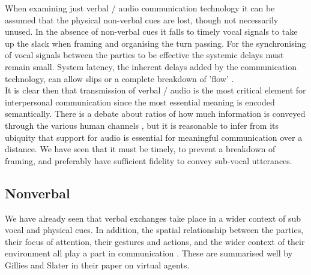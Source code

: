 When examining just verbal / audio communication technology it can be assumed that the physical non-verbal cues are lost, though not necessarily unused. In the absence of non-verbal cues it falls to timely vocal signals to take up the slack when framing and organising the turn passing. For the synchronising of vocal signals between the parties to be effective the systemic delays must remain small. System latency, the inherent delays added by the communication technology, can allow slips or a complete breakdown of 'flow' \cite{Katagiri2007}.\\
It is clear then that transmission of verbal / audio is the most critical element for interpersonal communication since the most essential meaning is encoded semantically. There is a debate about ratios of how much information is conveyed through the various human channels \cite{loomis2012sensory}, but it is reasonable to infer from its ubiquity that support for audio is essential for meaningful communication over a distance. We have seen that it must be timely, to prevent a breakdown of framing, and preferably have sufficient fidelity to convey sub-vocal utterances. \\
\subsection{Nonverbal}
We have already seen that verbal exchanges take place in a wider context of sub vocal and physical cues. In addition, the spatial relationship between the parties, their focus of attention, their gestures and actions, and the wider context of their environment all play a part in communication \cite{Goodwin2000a}. These are summarised well by Gillies and Slater \cite{Gillies2005} in their paper on virtual agents.\\
